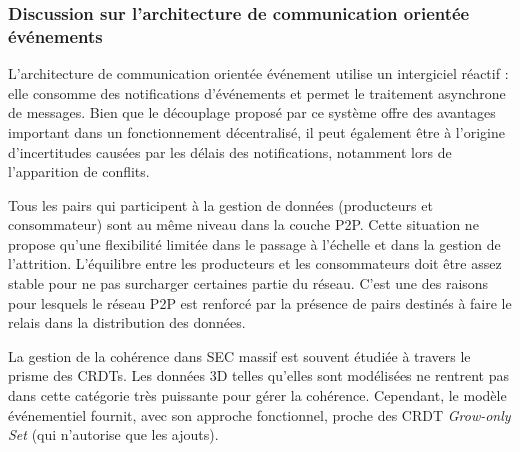 \subsubsection{Discussion sur l'architecture de communication \og orientée  
événements\fg{}}

L'architecture de communication orientée événement utilise un intergiciel réactif : 
elle consomme des notifications d'événements et permet le traitement asynchrone 
de messages. Bien que le découplage proposé par ce système offre des 
avantages important dans un fonctionnement décentralisé, il peut également 
être à l'origine d'incertitudes causées par les 
délais des notifications, notamment lors de l'apparition de conflits.

Tous les pairs qui participent à la gestion de 
données (producteurs et consommateur) sont au même 
niveau dans la couche \gls{P2P}. Cette situation ne propose qu'une flexibilité 
limitée dans le passage à l'échelle et dans la gestion de l'attrition. L'équilibre entre 
les producteurs 
et les consommateurs doit être assez stable pour ne pas surcharger certaines 
partie du réseau. C'est une des raisons pour lesquels le réseau 
\gls{P2P} est renforcé par la présence de pairs destinés à 
faire le relais dans la distribution des données. 

La gestion de la cohérence dans \gls{SEC} massif est souvent étudiée à travers le 
prisme des \glspl{CRDT}. Les données 3D telles qu'elles sont modélisées ne 
rentrent pas dans cette catégorie très puissante pour gérer la cohérence. 
Cependant, le modèle événementiel fournit, avec son approche fonctionnel, proche 
des  \gls{CRDT} \textit{Grow-only Set} (qui n'autorise que les ajouts).


%
%
%





